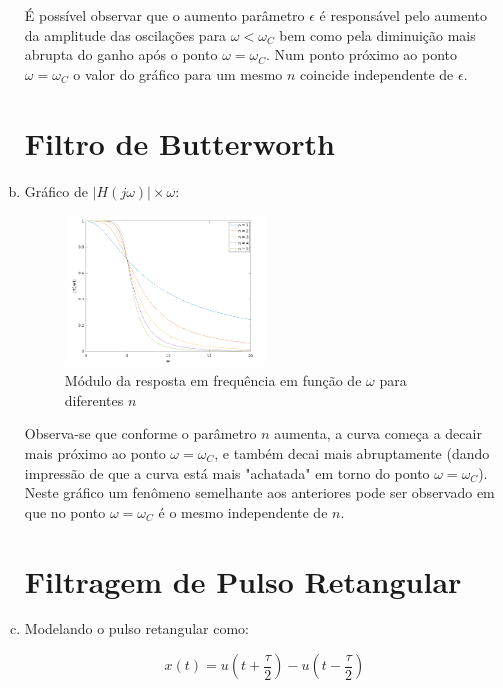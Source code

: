 \documentclass{article}
\begin{document}
\begin{enumerate}[(a)]
        É possível observar que o aumento parâmetro $\epsilon$ é responsável pelo aumento da amplitude das oscilações para $\omega < \omega_C$ bem como pela diminuição mais abrupta do ganho após o ponto $\omega  = \omega_C$. Num ponto próximo ao ponto $\omega = \omega_C$ o valor do gráfico para um mesmo $n$ coincide independente de $\epsilon$.

\break\vfill

\section{Filtro de Butterworth}

\item
    Gráfico de $|H(j\omega)| \times \omega$:
 \begin{figure}[H]
 \centering
 \includegraphics[width=0.5\textwidth]{images/hb_n.png}
     \caption{Módulo da resposta em frequência em função de $\omega$ para diferentes $n$}
 \end{figure}

        Observa-se que conforme o parâmetro $n$ aumenta, a curva começa a decair mais próximo ao ponto $\omega = \omega_C$, e também decai mais abruptamente (dando impressão de que a curva está mais "achatada" em torno do ponto $\omega = \omega_C$). Neste gráfico um fenômeno semelhante aos anteriores pode ser observado em que no ponto $\omega = \omega_C$ é o mesmo independente de $n$.

\break\vfill

\section{Filtragem de Pulso Retangular}

\item

    Modelando o pulso retangular como:

    \begin{equation}
        x(t) = u(t + \frac{\tau}{2}) - u(t - \frac{\tau}{2})
    \end{equation}


\end{enumerate}
\end{document}
